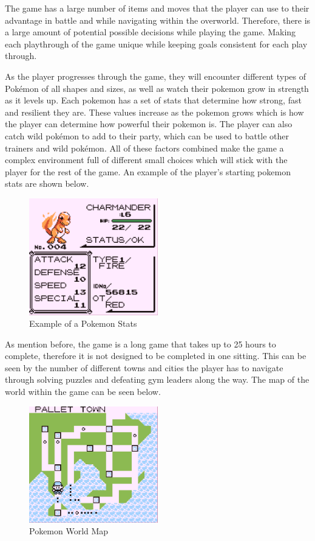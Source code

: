 The game has a large number of items and moves that the player can use to their advantage in battle and while navigating within the overworld. Therefore, there is a large amount of potential possible decisions while playing the game. Making each playthrough of the game unique while keeping goals consistent for each play through\cite{HubZ_1998}.

As the player progresses through the game, they will encounter different types of Pokémon of all shapes and sizes, as well as watch their pokemon grow in strength as it levels up. Each pokemon has a set of stats that determine how strong, fast and resilient they are. These values increase as the pokemon grows which is how the player can determine how powerful their pokemon is. The player can also catch wild pokémon to add to their party, which can be used to battle other trainers and wild pokémon. All of these factors combined make the game a complex environment full of different small choices which will stick with the player for the rest of the game. An example of the player's starting pokemon stats are shown below\cite{HubZ_1998}.

\begin{figure}[H]
    \centering
    \includegraphics[width=0.5\textwidth]{figures/red_stats.png}
    \caption{Example of a Pokemon Stats}
    \label{fig:pkmn_stats}
\end{figure}

As mention before, the game is a long game that takes up to 25 hours to complete, therefore it is not designed to be completed in one sitting. This can be seen by the number of different towns and cities the player has to navigate through solving puzzles and defeating gym leaders along the way. The map of the world within the game can be seen below\cite{HubZ_1998}. 

\begin{figure}[H]
    \centering
    \includegraphics[width=0.5\textwidth]{figures/red_map.png}
    \caption{Pokemon World Map}
    \label{fig:pkmn_map}
\end{figure}

